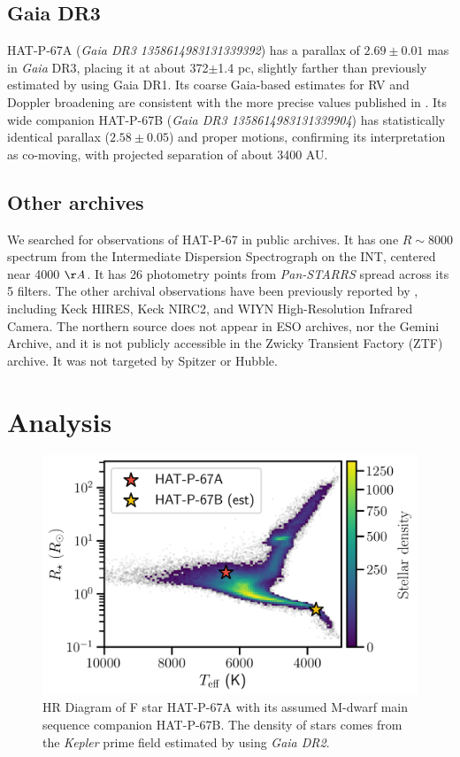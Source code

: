 \documentclass[twocolumn]{aastex631}
\begin{document}
\subsection{Gaia DR3}
HAT-P-67A (\emph{Gaia DR3 1358614983131339392}) has a parallax of $2.69\pm0.01$ mas in \emph{Gaia} DR3, placing it at about 372$\pm$1.4 pc, slightly farther than previously estimated by \citet{2017AJ....153..211Z} using Gaia DR1. Its coarse Gaia-based estimates for RV and Doppler broadening are consistent with the more precise values published in \citet{2017AJ....153..211Z}.  Its wide companion HAT-P-67B (\emph{Gaia DR3 1358614983131339904}) \citep{2019MNRAS.490.5088M} has statistically identical parallax ($2.58\pm0.05$) and proper motions, confirming its interpretation as co-moving, with projected separation of about 3400 AU.

\subsection{Other archives}
We searched for observations of HAT-P-67 in public archives.  It has one $R\sim8000$ spectrum from the Intermediate Dispersion Spectrograph on the INT, centered near 4000 $\AA$.  It has 26 photometry points from \emph{Pan-STARRS} spread across its 5 filters.  The other archival observations have been previously reported by \citet{2017AJ....153..211Z}, including Keck HIRES, Keck NIRC2, and WIYN High-Resolution Infrared Camera.  The northern source does not appear in ESO archives, nor the Gemini Archive, and it is not publicly accessible in the Zwicky Transient Factory (ZTF) archive.  It was not targeted by Spitzer or Hubble.



\section{Analysis}

\begin{figure}
    \includegraphics[width=\linewidth]{figures/Gaia_HAT_P_67_AB.png}
    \caption{HR Diagram of F star HAT-P-67A with its assumed M-dwarf main sequence companion HAT-P-67B.  The density of stars comes from the \emph{Kepler} prime field estimated by \citet{2020AJ....160..108B} using \emph{Gaia DR2}.}
    \label{fig:gaiaHRD}
\end{figure}
\end{document}
